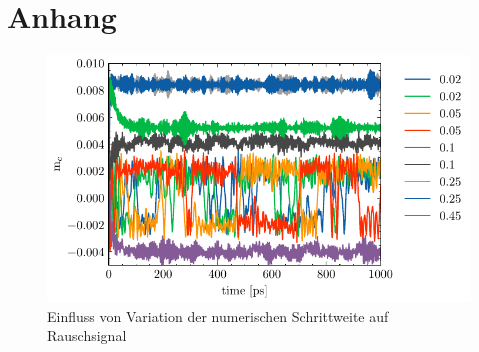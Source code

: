 \documentclass[main.tex]{subfiles}
\begin{document}
\newpage
\section{Anhang}

\begin{figure}[H]
    \centering
    \includegraphics{bilder/plots/dh_variation/mc_time.pdf}
    \caption{Einfluss von Variation der numerischen Schrittweite  auf Rauschsignal }\label{fig:dh-variation}
\end{figure}


\end{document}
